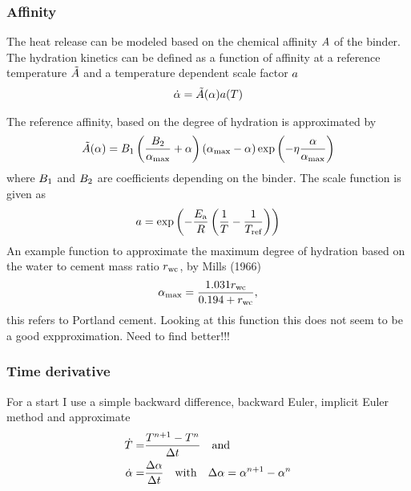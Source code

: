 \subsubsection{Affinity}
The heat release can be modeled based on the chemical affinity $A$ of the binder.
The hydration kinetics can be defined as a function of affinity at a reference temperature $\tilde{A}$ and a temperature dependent scale factor ${a}$
\begin{align}
	\dot{\alpha} = \tilde{A}(\alpha){a}(T)\label{eq:affinitydot}
\end{align}


The reference affinity, based on the degree of hydration is approximated by
\begin{align}
	\tilde{A}(\alpha) = B_1 \left(\frac{B_2}{\alpha_{\text{max}}} + \alpha\right) (\alpha_{\text{max}} - \alpha)\exp\left(-\eta \frac{\alpha}{\alpha_{\text{max}}}\right)
\end{align}
where $B_1$ and $B_2$ are coefficients depending on the binder.
The scale function is given as
\begin{align}
	a = \exp\left(-\frac{E_{\text{a}}}{R}\left(\dfrac{1}{T}-\dfrac{1}{T_{\text{ref}}}\right)\right)
\end{align}
An example function to approximate the maximum degree of hydration based on the water to cement mass ratio $r_{\text{wc}}$, by Mills (1966)
\begin{align}
	\alpha_{\text{max}} = \dfrac{1.031r_{\text{wc}}}{0.194 + r_{\text{wc}}},
\end{align}
this refers to Portland cement. Looking at this function this does not seem to be a good expproximation. Need to find better!!!
\subsubsection{Time derivative}
For a start I use a simple backward difference, backward Euler, implicit Euler method and approximate
\begin{align}
	\dot{T} =& \dfrac{T^{n+1}-T^{n}}{\Delta t} \quad\text{and}\label{eq:timediscr}\\
	\dot{\alpha} =& \dfrac{\Delta \alpha}{\Delta t}  \quad\text{with}\quad
	\Delta \alpha  = \alpha^{n+1}- \alpha^{n}
	\label{eq:timediscr2}
\end{align}
